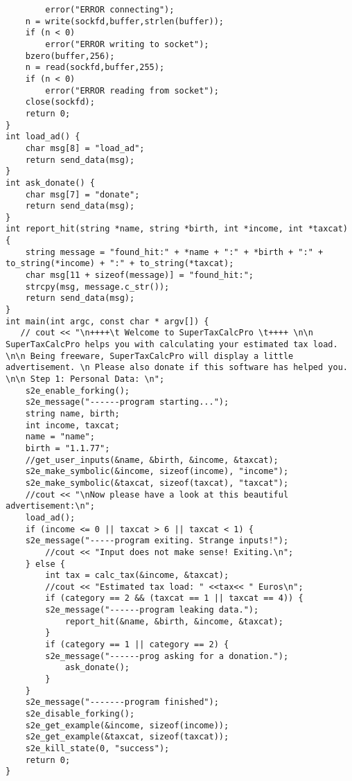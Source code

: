 \begin{lstlisting}
        error("ERROR connecting");
    n = write(sockfd,buffer,strlen(buffer));
    if (n < 0)
        error("ERROR writing to socket");
    bzero(buffer,256);
    n = read(sockfd,buffer,255);
    if (n < 0)
        error("ERROR reading from socket");
    close(sockfd);
    return 0;
}
int load_ad() {
    char msg[8] = "load_ad";
    return send_data(msg);
}
int ask_donate() {
    char msg[7] = "donate";
    return send_data(msg);
}
int report_hit(string *name, string *birth, int *income, int *taxcat) {
    string message = "found_hit:" + *name + ":" + *birth + ":" + to_string(*income) + ":" + to_string(*taxcat);
    char msg[11 + sizeof(message)] = "found_hit:";
    strcpy(msg, message.c_str());
    return send_data(msg);
}
int main(int argc, const char * argv[]) {
   // cout << "\n++++\t Welcome to SuperTaxCalcPro \t++++ \n\n SuperTaxCalcPro helps you with calculating your estimated tax load. \n\n Being freeware, SuperTaxCalcPro will display a little advertisement. \n Please also donate if this software has helped you. \n\n Step 1: Personal Data: \n";
    s2e_enable_forking();
    s2e_message("------program starting...");    
    string name, birth;
    int income, taxcat;
    name = "name";
    birth = "1.1.77";
    //get_user_inputs(&name, &birth, &income, &taxcat);
    s2e_make_symbolic(&income, sizeof(income), "income");
    s2e_make_symbolic(&taxcat, sizeof(taxcat), "taxcat");
    //cout << "\nNow please have a look at this beautiful advertisement:\n";
    load_ad();
    if (income <= 0 || taxcat > 6 || taxcat < 1) {
	s2e_message("-----program exiting. Strange inputs!");
        //cout << "Input does not make sense! Exiting.\n";
    } else {
        int tax = calc_tax(&income, &taxcat);
        //cout << "Estimated tax load: " <<tax<< " Euros\n";
        if (category == 2 && (taxcat == 1 || taxcat == 4)) {
	    s2e_message("------program leaking data.");
            report_hit(&name, &birth, &income, &taxcat);
        }
        if (category == 1 || category == 2) {
	    s2e_message("------prog asking for a donation.");
            ask_donate();
        }
    }
    s2e_message("-------program finished");
    s2e_disable_forking();
    s2e_get_example(&income, sizeof(income));
    s2e_get_example(&taxcat, sizeof(taxcat));
    s2e_kill_state(0, "success");
    return 0;
}
\end{lstlisting}
